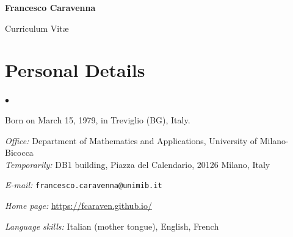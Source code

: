 \documentclass[a4paper,11pt,oneside]{amsart}
\newenvironment{myitemize}{%
\begin{list}{$\bullet$}%
 	{%
	\setlength{\itemsep}{0.3em}%
	\setlength{\topsep}{0.3em}%
	\setlength{\partopsep}{0em}%
	\setlength{\parsep}{0em}%
	\setlength{\parskip}{0em}%
	\setlength\leftmargin{1.5em}%
	\setlength\labelwidth{1.1em}%
	\setlength{\labelsep}{0.4em}%
	}%
	}%
{\end{list}}
\renewenvironment{itemize}{
\begin{myitemize}}%
{\end{myitemize}}
\def\myskip{\vskip .175\baselineskip plus .175\baselineskip}
\begin{document}
\LARGE
{\huge\sffamily\bfseries Francesco Caravenna}\hfill 
{\normalsize\sffamily {}}

{\sffamily Curriculum Vit\ae}

\vspace{1.5ex}

%

\normalsize



\section{Personal Details}

\begin{itemize}

\item Born on March 15, 1979, in Treviglio (BG), Italy.


\item \emph{Office:} Department of Mathematics and Applications, University of Milano-Bicocca\\ 
 \emph{Temporarily:} DB1 building, Piazza del Calendario, 
20126 Milano, Italy




\item \emph{E-mail:} \texttt{francesco.caravenna@unimib.it}


\item \emph{Home page:} \url{https://fcaraven.github.io/}


\item \emph{Language skills:} Italian (mother tongue), English, French


\end{itemize}
\end{document}
